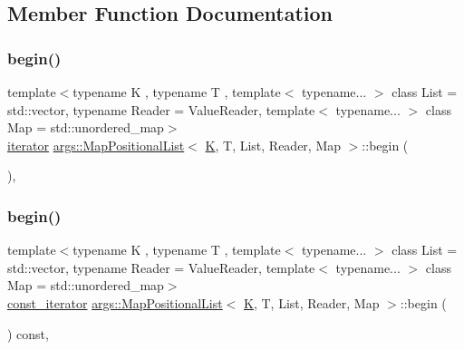 \subsection{Member Function Documentation}
\mbox{\label{classargs_1_1_map_positional_list_a5ec966fa9cf2064c32026b817e1a8f25}} 
\subsubsection{\texorpdfstring{begin()}{begin()}\hspace{0.1cm}{\footnotesize\ttfamily [1/2]}}
{\footnotesize\ttfamily template$<$typename K , typename T , template$<$ typename... $>$ class List = std\+::vector, typename Reader  = Value\+Reader, template$<$ typename... $>$ class Map = std\+::unordered\+\_\+map$>$ \\
\hyperlink{classargs_1_1_map_positional_list_a4e3fbeb6f894505ce48d35fe76dc157a}{iterator} \hyperlink{classargs_1_1_map_positional_list}{args\+::\+Map\+Positional\+List}$<$ \hyperlink{cgal__test_8cpp_a891e241aa245ae63618f03737efba309}{K}, T, List, Reader, Map $>$\+::begin (\begin{DoxyParamCaption}{ }\end{DoxyParamCaption})\hspace{0.3cm}{\ttfamily [inline]}, {\ttfamily [noexcept]}}

\mbox{\label{classargs_1_1_map_positional_list_a40aecf3ee765506dbf54628d6ba999a5}} 
\subsubsection{\texorpdfstring{begin()}{begin()}\hspace{0.1cm}{\footnotesize\ttfamily [2/2]}}
{\footnotesize\ttfamily template$<$typename K , typename T , template$<$ typename... $>$ class List = std\+::vector, typename Reader  = Value\+Reader, template$<$ typename... $>$ class Map = std\+::unordered\+\_\+map$>$ \\
\hyperlink{classargs_1_1_map_positional_list_a0700556b0a067e095ee22edbb18206fc}{const\+\_\+iterator} \hyperlink{classargs_1_1_map_positional_list}{args\+::\+Map\+Positional\+List}$<$ \hyperlink{cgal__test_8cpp_a891e241aa245ae63618f03737efba309}{K}, T, List, Reader, Map $>$\+::begin (\begin{DoxyParamCaption}{ }\end{DoxyParamCaption}) const\hspace{0.3cm}{\ttfamily [inline]}, {\ttfamily [noexcept]}}

